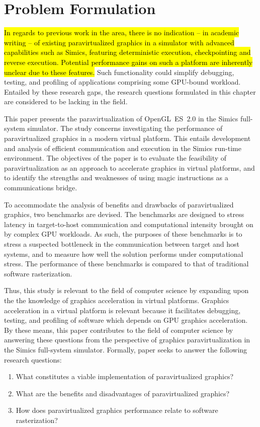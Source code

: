 
\section{Problem Formulation}
\label{sec:problemformulation}
\hl{In regards to previous work in the area, there is no indication -- in academic writing -- of existing paravirtualized graphics in a simulator with advanced capabilities such as Simics, featuring deterministic execution, checkpointing and reverse execution.
Potential performance gains on such a platform are inherently unclear due to these features.}
Such functionality could simplify debugging, testing, and profiling of applications comprising some GPU-bound workload.
Entailed by these research gaps, the research questions formulated in this chapter are considered to be lacking in the field.

This paper presents the paravirtualization of OpenGL~ES~$2.0$ in the Simics full-system simulator. 
The study concerns investigating the performance of paravirtualized graphics in a modern virtual platform.
This entails development and analysis of efficient communication and execution in the Simics run-time environment.
The objectives of the paper is to evaluate the feasibility of paravirtualization as an approach to accelerate graphics in virtual platforms, and to identify the strengths and weaknesses of using magic instructions as a communications bridge.

To accommodate the analysis of benefits and drawbacks of paravirtualized graphics, two benchmarks are devised.
The benchmarks are designed to stress latency in target-to-host communication and computational intensity brought on by complex GPU workloads.
As such, the purposes of these benchmarks is to stress a suspected bottleneck in the communication between target and host systems, and to measure how well the solution performs under computational stress.
The performance of these benchmarks is compared to that of traditional software rasterization.

Thus, this study is relevant to the field of computer science by expanding upon the the knowledge of graphics acceleration in virtual platforms.
Graphics acceleration in a virtual platform is relevant because it facilitates debugging, testing, and profiling of software which depends on GPU graphics acceleration.
By these means, this paper contributes to the field of computer science by answering these questions from the perspective of graphics paravirtualization in the Simics full-system simulator.
Formally, paper seeks to answer the following research questions:

\begin{enumerate}
  \item What constitutes a viable implementation of paravirtualized graphics?
  \item What are the benefits and disadvantages of paravirtualized graphics?
  \item How does paravirtualized graphics performance relate to software rasterization?
\end{enumerate}
